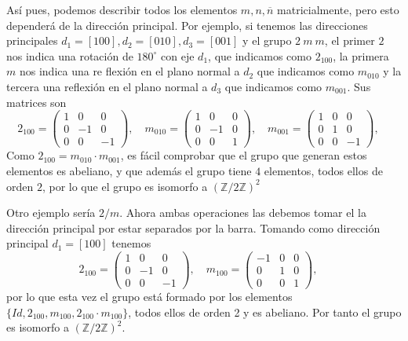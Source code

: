 \documentclass[leqno]{article}
\begin{document}
Así pues, podemos describir todos los elementos $m, n, \overline{n}$ matricialmente, pero esto dependerá de la dirección principal. Por ejemplo, si tenemos las direcciones principales $d_1=[1 0 0], d_2=[010], d_3=[001]$ y el grupo $2\ m\ m$, el primer  $2$ nos indica una rotación de $180^\circ$ con eje $d_1$, que indicamos como $2_{100}$, la primera $m$ nos indica una re flexión en el plano normal a $d_2$ que indicamos como $m_{010}$ y la tercera una reflexión en el plano normal a $d_3$ que indicamos como $m_{001}$. Sus matrices son
 \[
   2_{100} = \begin{pmatrix} 1 & 0& 0 \\ 0 & -1 & 0 \\ 0 & 0 & -1 \end{pmatrix}, \quad  
   m_{010} = \begin{pmatrix} 1 & 0& 0 \\ 0 & -1 & 0 \\ 0 & 0 & 1 \end{pmatrix}, \quad  
   m_{001} = \begin{pmatrix} 1 & 0& 0 \\ 0 & 1 & 0 \\ 0 & 0 & -1 \end{pmatrix}, \quad  
\] 
Como $2_{100} = m_{010}\cdot m_{001}$, es fácil comprobar que el grupo que generan estos elementos es abeliano, y que además  el grupo tiene  $4$ elementos, todos ellos de orden  $2$, por lo que el grupo es isomorfo a  $ (\mathbb{Z} / 2\mathbb{Z} )^2$

Otro ejemplo sería $2 / m$. Ahora ambas operaciones las debemos tomar el la dirección principal por estar separados por la barra. Tomando como dirección principal  $d_1=[100]$ tenemos
\[
   2_{100} = \begin{pmatrix} 1 & 0& 0 \\ 0 & -1 & 0 \\ 0 & 0 & -1 \end{pmatrix}, \quad  
   m_{100} = \begin{pmatrix} -1 & 0& 0 \\ 0 & 1 & 0 \\ 0 & 0 & 1 \end{pmatrix}, \quad  
\]
por lo que esta vez el grupo está formado por los elementos $\{Id, 2_{100}, m_{100}, 2_{100}\cdot m_{100}\}$, todos ellos de orden 2 y es abeliano. Por tanto el grupo es isomorfo a $(\mathbb{Z} / 2\mathbb{Z}) ^2$.
\end{document}
